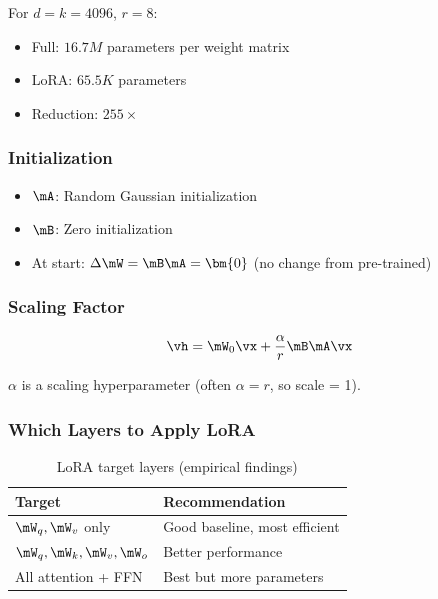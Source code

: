 \begin{example}
For $d = k = 4096$, $r = 8$:
\begin{itemize}
    \item Full: $16.7M$ parameters per weight matrix
    \item LoRA: $65.5K$ parameters
    \item Reduction: $255\times$
\end{itemize}
\end{example}

\subsubsection{Initialization}

\begin{itemize}
    \item $\mA$: Random Gaussian initialization
    \item $\mB$: Zero initialization
    \item At start: $\Delta \mW = \mB \mA = \bm{0}$ (no change from pre-trained)
\end{itemize}

\subsubsection{Scaling Factor}

\begin{equation}
\vh = \mW_0 \vx + \frac{\alpha}{r} \mB \mA \vx
\end{equation}

$\alpha$ is a scaling hyperparameter (often $\alpha = r$, so scale = 1).

\subsubsection{Which Layers to Apply LoRA}

\begin{table}[H]
\centering
\caption{LoRA target layers (empirical findings)}
\begin{tabularx}{\textwidth}{lX}
\toprule
\textbf{Target} & \textbf{Recommendation} \\
\midrule
$\mW_q, \mW_v$ only & Good baseline, most efficient \\
$\mW_q, \mW_k, \mW_v, \mW_o$ & Better performance \\
All attention + FFN & Best but more parameters \\
\bottomrule
\end{tabularx}
\end{table}

